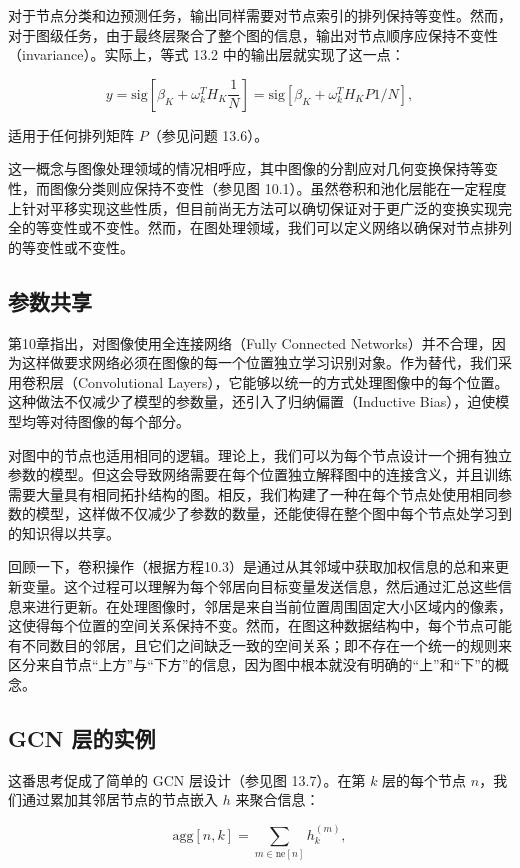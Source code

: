对于节点分类和边预测任务，输出同样需要对节点索引的排列保持等变性。然而，对于图级任务，由于最终层聚合了整个图的信息，输出对节点顺序应保持不变性（invariance）。实际上，等式 13.2 中的输出层就实现了这一点：

\[
y = \text{sig}[\beta_K + \omega_k^T H_K \frac{1}{N}] = \text{sig}[\beta_K + \omega_k^T H_KP1/N], \tag{13.7}
\]

适用于任何排列矩阵 \(P\)（参见问题 13.6）。

这一概念与图像处理领域的情况相呼应，其中图像的分割应对几何变换保持等变性，而图像分类则应保持不变性（参见图 10.1）。虽然卷积和池化层能在一定程度上针对平移实现这些性质，但目前尚无方法可以确切保证对于更广泛的变换实现完全的等变性或不变性。然而，在图处理领域，我们可以定义网络以确保对节点排列的等变性或不变性。
\subsection{参数共享}
第10章指出，对图像使用全连接网络（Fully Connected Networks）并不合理，因为这样做要求网络必须在图像的每一个位置独立学习识别对象。作为替代，我们采用卷积层（Convolutional Layers），它能够以统一的方式处理图像中的每个位置。这种做法不仅减少了模型的参数量，还引入了归纳偏置（Inductive Bias），迫使模型均等对待图像的每个部分。

对图中的节点也适用相同的逻辑。理论上，我们可以为每个节点设计一个拥有独立参数的模型。但这会导致网络需要在每个位置独立解释图中的连接含义，并且训练需要大量具有相同拓扑结构的图。相反，我们构建了一种在每个节点处使用相同参数的模型，这样做不仅减少了参数的数量，还能使得在整个图中每个节点处学习到的知识得以共享。

回顾一下，卷积操作（根据方程10.3）是通过从其邻域中获取加权信息的总和来更新变量。这个过程可以理解为每个邻居向目标变量发送信息，然后通过汇总这些信息来进行更新。在处理图像时，邻居是来自当前位置周围固定大小区域内的像素，这使得每个位置的空间关系保持不变。然而，在图这种数据结构中，每个节点可能有不同数目的邻居，且它们之间缺乏一致的空间关系；即不存在一个统一的规则来区分来自节点“上方”与“下方”的信息，因为图中根本就没有明确的“上”和“下”的概念。

\subsection{GCN 层的实例}
这番思考促成了简单的 GCN 层设计（参见图 13.7）。在第 \(k\) 层的每个节点 \(n\)，我们通过累加其邻居节点的节点嵌入 \(h\) 来聚合信息：

\[
\text{agg}[n, k] = \sum_{m \in \text{ne}[n]} h_k^{(m)}, \tag{13.8}
\]

